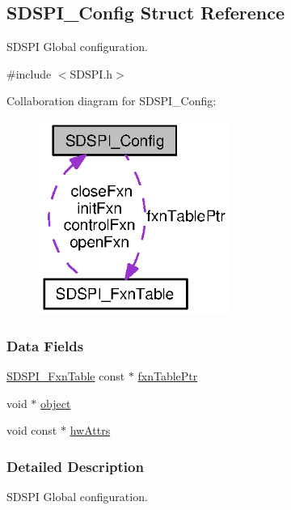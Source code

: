 \subsection{S\+D\+S\+P\+I\+\_\+\+Config Struct Reference}
\label{struct_s_d_s_p_i___config}


S\+D\+S\+P\+I Global configuration.  




{\ttfamily \#include $<$S\+D\+S\+P\+I.\+h$>$}



Collaboration diagram for S\+D\+S\+P\+I\+\_\+\+Config\+:
\nopagebreak
\begin{figure}[H]
\begin{center}
\leavevmode
\includegraphics[width=177pt]{struct_s_d_s_p_i___config__coll__graph}
\end{center}
\end{figure}
\subsubsection*{Data Fields}
\begin{DoxyCompactItemize}
\item 
\hyperlink{struct_s_d_s_p_i___fxn_table}{S\+D\+S\+P\+I\+\_\+\+Fxn\+Table} const $\ast$ \hyperlink{struct_s_d_s_p_i___config_a5e816ddb1d2229f1016b99cba4153be0}{fxn\+Table\+Ptr}
\item 
void $\ast$ \hyperlink{struct_s_d_s_p_i___config_a019c899a3fc8e190998de085e900e5b6}{object}
\item 
void const $\ast$ \hyperlink{struct_s_d_s_p_i___config_a65d8bf130f6e7f1fe0ae550bf52df01f}{hw\+Attrs}
\end{DoxyCompactItemize}


\subsubsection{Detailed Description}
S\+D\+S\+P\+I Global configuration. 

